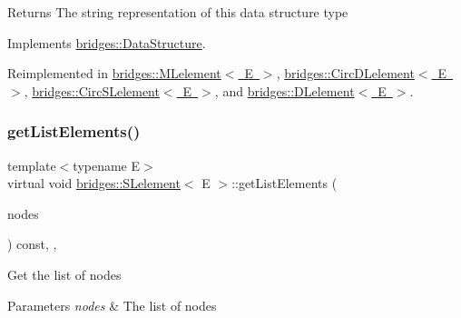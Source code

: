 \begin{DoxyReturn}{Returns}
The string representation of this data structure type 
\end{DoxyReturn}


Implements \mbox{\hyperlink{classbridges_1_1_data_structure_a957a63b106e340bc753620c650632bdc}{bridges\+::\+Data\+Structure}}.



Reimplemented in \mbox{\hyperlink{classbridges_1_1_m_lelement_af6e8a50c38e6481ce2c569d0174c564e}{bridges\+::\+M\+Lelement$<$ E $>$}}, \mbox{\hyperlink{classbridges_1_1_circ_d_lelement_a0e199fe681755df694807261ce2460c2}{bridges\+::\+Circ\+D\+Lelement$<$ E $>$}}, \mbox{\hyperlink{classbridges_1_1_circ_s_lelement_a4b27c205af46162371e3ffe05cbbe3d5}{bridges\+::\+Circ\+S\+Lelement$<$ E $>$}}, and \mbox{\hyperlink{classbridges_1_1_d_lelement_a109be7aba8bd3d0450859938b5d3144c}{bridges\+::\+D\+Lelement$<$ E $>$}}.

\mbox{\label{classbridges_1_1_s_lelement_a954395391ee5cfe3a64b9f7aca4b3b21}} 
\subsubsection{\texorpdfstring{get\+List\+Elements()}{getListElements()}}
{\footnotesize\ttfamily template$<$typename E$>$ \\
virtual void \mbox{\hyperlink{classbridges_1_1_s_lelement}{bridges\+::\+S\+Lelement}}$<$ E $>$\+::get\+List\+Elements (\begin{DoxyParamCaption}\item[{vector$<$ const \mbox{\hyperlink{classbridges_1_1_s_lelement}{S\+Lelement}}$<$ E $>$ $\ast$$>$ \&}]{nodes }\end{DoxyParamCaption}) const\hspace{0.3cm}{\ttfamily [inline]}, {\ttfamily [protected]}, {\ttfamily [virtual]}}

Get the list of nodes


\begin{DoxyParams}{Parameters}
{\em nodes} & The list of nodes \\
\hline
\end{DoxyParams}
\mbox{\label{classbridges_1_1_s_lelement_a5bd74108a9aa49339378bf62cdbb19ca}} 

